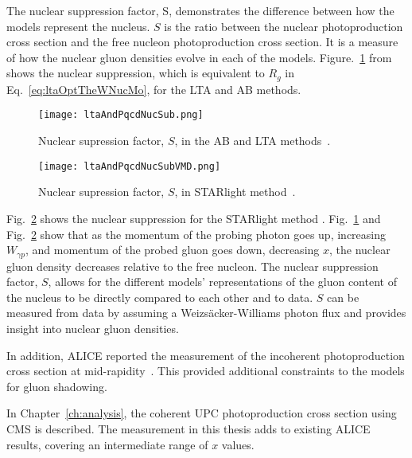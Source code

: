   The nuclear suppression factor, S, demonstrates the difference between how 
    the models represent the nucleus. 
  $S$ is the ratio between the nuclear photoproduction cross section and the     
    free nucleon photoproduction cross section.
  It is a measure of how the nuclear gluon densities evolve in each of the 
    models. 
  Figure.~\ref{fig:ltaAndPqcdNucSub} from \cite{lta2013.05} shows the nuclear 
    suppression, which is equivalent to $R_g$ in Eq.~\ref{eq:ltaOptTheWNucMo}, 
    for the LTA and AB methods.
  \begin{figure}[h] 
    \begin{center}
      \texttt{[image: ltaAndPqcdNucSub.png]}
    \end{center}
    \caption{ \label{fig:ltaAndPqcdNucSub} Nuclear supression factor, $S$, in the AB and LTA methods~\cite{lta2013.05}.}
  \end{figure}
  \begin{figure}
    \begin{center}
      \texttt{[image: ltaAndPqcdNucSubVMD.png]}
    \end{center}
    \caption{ \label{fig:ltaAndPqcdNucSubSTARlight} Nuclear supression factor, $S$, in STARlight method~\cite{lta2013.05}.}
  \end{figure}
  Fig.~\ref{fig:ltaAndPqcdNucSubSTARlight} shows the nuclear suppression for the STARlight 
    method \cite{lta2013.05}. 
  Fig.~\ref{fig:ltaAndPqcdNucSub} and Fig.~\ref{fig:ltaAndPqcdNucSubSTARlight} 
    show that as the momentum of the probing photon goes up, increasing 
    $W_{\gamma p}$, and momentum of the probed gluon goes down, decreasing $x$, 
    the nuclear gluon density decreases relative to the free nucleon. 
  The nuclear suppression factor, $S$, allows for the different models' 
    representations of the gluon content of the nucleus to be directly compared
    to each other and to data. 
  $S$ can be measured from data by assuming a Weizs\"{a}cker-Williams photon flux and 
    provides insight into nuclear gluon densities.

  In addition, ALICE reported the measurement of the incoherent \JPsi{} 
    photoproduction cross section at mid-rapidity~\cite{Abbas:2013oua}.
  This provided additional constraints to the models for gluon shadowing. 

  In Chapter~\ref{ch:analysis}, the coherent UPC \JPsi{} photoproduction 
    cross section using CMS is described.
  The measurement in this thesis adds to existing ALICE results, covering
    an intermediate range of $x$ values. 
